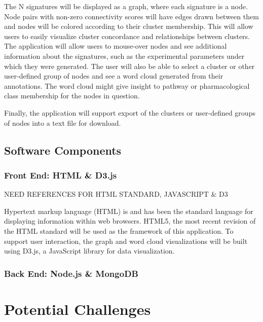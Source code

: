 \documentclass[12pt]{article}
\begin{document}
The N signatures will be displayed as a graph, where each signature is a node. Node pairs with non-zero connectivity scores will have edges drawn between them and nodes will be colored according to their cluster membership. This will allow users to easily visualize cluster concordance and relationships between clusters. The application will allow users to mouse-over nodes and see additional information about the signatures, such as the experimental parameters under which they were generated. The user will also be able to select a cluster or other user-defined group of nodes and see a word cloud generated from their annotations. The word cloud might give insight to pathway or pharmacological class membership for the nodes in question.

Finally, the application will support export of the clusters or user-defined groups of nodes into a text file for download.

\subsection{Software Components}
\subsubsection{Front End: HTML \& D3.js}

NEED REFERENCES FOR HTML STANDARD, JAVASCRIPT & D3

Hypertext markup language (HTML) is and has been the standard language for displaying information within web browsers. HTML5, the most recent revision of the HTML standard will be used as the framework of this application. To support user interaction, the graph and word cloud visualizations will be built using D3.js, a JavaScript library for data visualization.  

\subsubsection{Back End: Node.js \& MongoDB}

\section{Potential Challenges}



\end{document}
